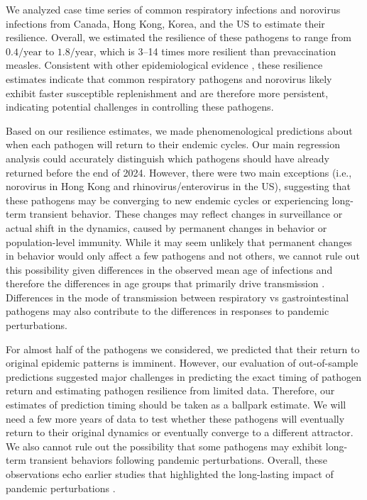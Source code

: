 \documentclass[12pt]{article}
\begin{document}
We analyzed case time series of common respiratory infections and norovirus infections from Canada, Hong Kong, Korea, and the US to estimate their resilience.
Overall, we estimated the resilience of these pathogens to range from $0.4/\mathrm{year}$ to $1.8/\mathrm{year}$, which is 3--14 times more resilient than prevaccination measles.
Consistent with other epidemiological evidence \citep{bosis2008role,o2009symptomatic,pitzer2015environmental,edridge2020seasonal}, these resilience estimates indicate that common respiratory pathogens and norovirus likely exhibit faster susceptible replenishment and are therefore more persistent, indicating potential challenges in controlling these pathogens.

Based on our resilience estimates, we made phenomenological predictions about when each pathogen will return to their endemic cycles.
Our main regression analysis could accurately distinguish which pathogens should have already returned before the end of 2024.
However, there were two main exceptions (i.e., norovirus in Hong Kong and rhinovirus/enterovirus in the US), suggesting that these pathogens may be converging to new endemic cycles or experiencing long-term transient behavior.
These changes may reflect changes in surveillance or actual shift in the dynamics, caused by permanent changes in behavior or population-level immunity.
While it may seem unlikely that permanent changes in behavior would only affect a few pathogens and not others, we cannot rule out this possibility given differences in the observed mean age of infections and therefore the differences in age groups that primarily drive transmission \citep{radin2014epidemiology,lv2024epidemiological}.
Differences in the mode of transmission between respiratory vs gastrointestinal pathogens may also contribute to the differences in responses to pandemic perturbations.

For almost half of the pathogens we considered, we predicted that their return to original epidemic patterns is imminent.
However, our evaluation of out-of-sample predictions suggested major challenges in predicting the exact timing of pathogen return and estimating pathogen resilience from limited data. 
Therefore, our estimates of prediction timing should be taken as a ballpark estimate.
We will need a few more years of data to test whether these pathogens will eventually return to their original dynamics or eventually converge to a different attractor.
We also cannot rule out the possibility that some pathogens may exhibit long-term transient behaviors following pandemic perturbations.
Overall, these observations echo earlier studies that highlighted the long-lasting impact of pandemic perturbations \citep{baker2022long,caini2024probable,chen2024covid,park2024predicting,nielsen2025complex}. 
\end{document}
